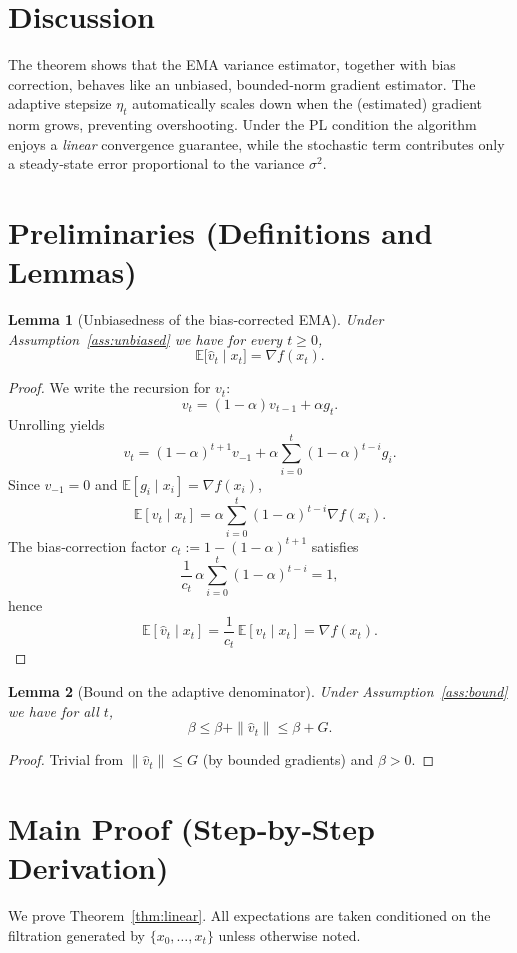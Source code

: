 \documentclass{article}
\newtheorem{lemma}{Lemma}[section]
\begin{document}
\section*{Discussion}
The theorem shows that the EMA variance estimator, together with bias correction,
behaves like an unbiased, bounded‑norm gradient estimator.  The adaptive stepsize
$\eta_t$ automatically scales down when the (estimated) gradient norm grows,
preventing overshooting.  Under the PL condition the algorithm enjoys a
\emph{linear} convergence guarantee, while the stochastic term contributes only a
steady‑state error proportional to the variance $\sigma^2$.

\section*{Preliminaries (Definitions and Lemmas)}

\begin{lemma}[Unbiasedness of the bias‑corrected EMA]\label{lem:unbiased}
Under Assumption~\ref{ass:unbiased} we have for every $t\ge0$,
\[
\mathbb{E}\!\big[\hat v_t\mid x_t\big]=\nabla f(x_t).
\]
\end{lemma}
\begin{proof}
We write the recursion for $v_t$:
\[
v_t=(1-\alpha)v_{t-1}+\alpha g_t.
\]
Unrolling yields
\[
v_t=(1-\alpha)^{t+1}v_{-1}+\alpha\sum_{i=0}^{t}(1-\alpha)^{t-i}g_i .
\]
Since $v_{-1}=0$ and $\mathbb{E}[g_i\mid x_i]=\nabla f(x_i)$,
\[
\mathbb{E}[v_t\mid x_t]=\alpha\sum_{i=0}^{t}(1-\alpha)^{t-i}\nabla f(x_i).
\]
The bias‑correction factor $c_t:=1-(1-\alpha)^{t+1}$ satisfies
\[
\frac{1}{c_t}\,\alpha\sum_{i=0}^{t}(1-\alpha)^{t-i}=1,
\]
hence
\[
\mathbb{E}[\hat v_t\mid x_t]=\frac{1}{c_t}\,\mathbb{E}[v_t\mid x_t]=\nabla f(x_t).
\]
\qedhere
\end{proof}

\begin{lemma}[Bound on the adaptive denominator]\label{lem:denom}
Under Assumption~\ref{ass:bound} we have for all $t$,
\[
\beta\le \beta+\|\hat v_t\|\le \beta+G .
\]
\end{lemma}
\begin{proof}
Trivial from $\|\hat v_t\|\le G$ (by bounded gradients) and $\beta>0$.
\qedhere
\end{proof}

\section*{Main Proof (Step‑by‑Step Derivation)}
We prove Theorem~\ref{thm:linear}.  All expectations are taken conditioned on the
filtration generated by $\{x_0,\dots,x_t\}$ unless otherwise noted.
\end{document}
